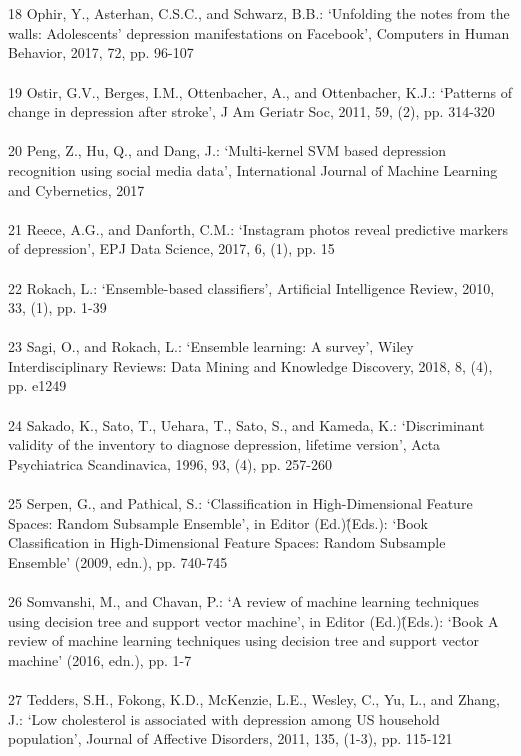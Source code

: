 \documentclass[runningheads]{llncs}
\begin{document}
\begin{thebibliography}{8}
\\\\
18	Ophir, Y., Asterhan, C.S.C., and Schwarz, B.B.: ‘Unfolding the notes from the walls: Adolescents’ depression manifestations on Facebook’, Computers in Human Behavior, 2017, 72, pp. 96-107
\\\\
19	Ostir, G.V., Berges, I.M., Ottenbacher, A., and Ottenbacher, K.J.: ‘Patterns of change in depression after stroke’, J Am Geriatr Soc, 2011, 59, (2), pp. 314-320
\\\\
20	Peng, Z., Hu, Q., and Dang, J.: ‘Multi-kernel SVM based depression recognition using social media data’, International Journal of Machine Learning and Cybernetics, 2017
\\\\
21	Reece, A.G., and Danforth, C.M.: ‘Instagram photos reveal predictive markers of depression’, EPJ Data Science, 2017, 6, (1), pp. 15
\\\\
22	Rokach, L.: ‘Ensemble-based classifiers’, Artificial Intelligence Review, 2010, 33, (1), pp. 1-39
\\\\
23	Sagi, O., and Rokach, L.: ‘Ensemble learning: A survey’, Wiley Interdisciplinary Reviews: Data Mining and Knowledge Discovery, 2018, 8, (4), pp. e1249
\\\\
24	Sakado, K., Sato, T., Uehara, T., Sato, S., and Kameda, K.: ‘Discriminant validity of the inventory to diagnose depression, lifetime version’, Acta Psychiatrica Scandinavica, 1996, 93, (4), pp. 257-260
\\\\
25	Serpen, G., and Pathical, S.: ‘Classification in High-Dimensional Feature Spaces: Random Subsample Ensemble’, in Editor (Ed.)\^(Eds.): ‘Book Classification in High-Dimensional Feature Spaces: Random Subsample Ensemble’ (2009, edn.), pp. 740-745
\\\\
26	Somvanshi, M., and Chavan, P.: ‘A review of machine learning techniques using decision tree and support vector machine’, in Editor (Ed.)\^(Eds.): ‘Book A review of machine learning techniques using decision tree and support vector machine’ (2016, edn.), pp. 1-7
\\\\
27	Tedders, S.H., Fokong, K.D., McKenzie, L.E., Wesley, C., Yu, L., and Zhang, J.: ‘Low cholesterol is associated with depression among US household population’, Journal of Affective Disorders, 2011, 135, (1-3), pp. 115-121

\end{thebibliography}
\end{document}

